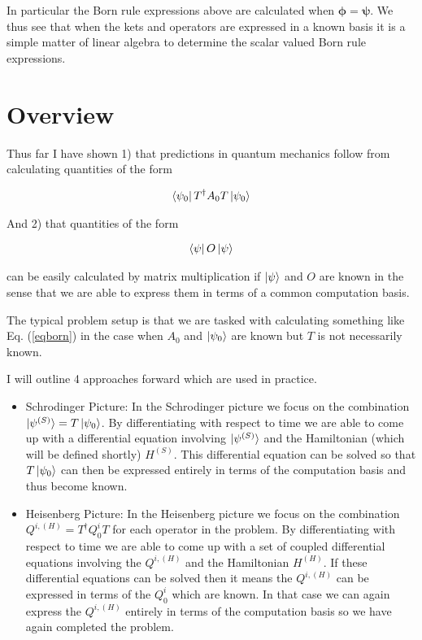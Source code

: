 \documentclass[12pt]{article}
\newcommand{\bv}[1]{\boldsymbol{#1}}
\begin{document}
In particular the Born rule expressions above are calculated when $\bv{\phi} = \bv{\psi}$. 
We thus see that when the kets and operators are expressed in a known basis it is a simple matter of linear algebra to determine the scalar valued Born rule expressions.

\section{Overview}

Thus far I have shown 1) that predictions in quantum mechanics follow from calculating quantities of the form

\begin{align}
\label{eqborn}
\bra{\psi_0}T^{\dag}A_0T\ket{\psi_0}
\end{align}

And 2) that quantities of the form

\begin{align}
\bra{\psi}O\ket{\psi}
\end{align}

can be easily calculated by matrix multiplication if $\ket{\psi}$ and $O$ are known in the sense that we are able to express them in terms of a common computation basis.

The typical problem setup is that we are tasked with calculating something like Eq. (\ref{eqborn}) in the case when $A_0$ and $\ket{\psi_0}$ are known but $T$ is not necessarily known.

I will outline 4 approaches forward which are used in practice.

\begin{itemize}
\item{Schrodinger Picture: In the Schrodinger picture we focus on the combination $\ket{\psi^{(S)}} = T\ket{\psi_0}$. By differentiating with respect to time we are able to come up with a differential equation involving $\ket{\psi^{(S)}}$ and the Hamiltonian (which will be defined shortly) $H^{(S)}$. This differential equation can be solved so that $T\ket{\psi_0}$ can then be expressed entirely in terms of the computation basis and thus become known.}
\item{Heisenberg Picture: In the Heisenberg picture we focus on the combination $Q^{i,(H)} = T^{\dag}Q^i_0 T$ for each operator in the problem. By differentiating with respect to time we are able to come up with a set of coupled differential equations involving the $Q^{i,(H)}$ and the Hamiltonian $H^{(H)}$. If these differential equations can be solved then it means the $Q^{i, (H)}$ can be expressed in terms of the $Q^i_0$ which are known. In that case we can again express the $Q^{i,(H)}$ entirely in terms of the computation basis so we have again completed the problem.}
\end{itemize}
\end{document}

